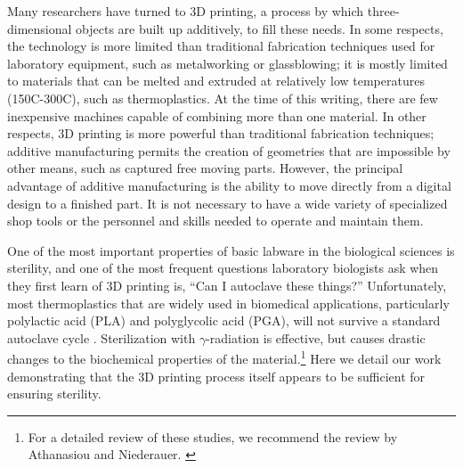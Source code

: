 \begin{refsection}
Many researchers have turned to 3D printing, a process by which three-
dimensional objects are built up additively, to fill these needs. In
some respects, the technology is more limited than traditional
fabrication techniques used for laboratory equipment, such as
metalworking or glassblowing; it is mostly limited to materials that
can be melted and extruded at relatively low temperatures (150C-300C),
such as thermoplastics.  At the time of this writing, there are few
inexpensive machines capable of combining more than one material. In
other respects, 3D printing is more powerful than traditional
fabrication techniques; additive manufacturing permits the creation of
geometries that are impossible by other means, such as captured free
moving parts. However, the principal advantage of additive
manufacturing is the ability to move directly from a digital design to
a finished part. It is not necessary to have a wide variety of
specialized shop tools or the personnel and skills needed to operate
and maintain them.

One of the most important properties of basic labware in the
biological sciences is sterility, and one of the most frequent
questions laboratory biologists ask when they first learn of 3D
printing is, ``Can I autoclave these things?'' Unfortunately, most
thermoplastics that are widely used in biomedical applications,
particularly polylactic acid (PLA) and polyglycolic acid (PGA), will
not survive a standard autoclave cycle
\cite{steam_sterilization_PLA}. Sterilization with $\gamma$-radiation
is effective, but causes drastic changes to the biochemical properties
of the material.\footnote{For a detailed review of these studies, we
  recommend the review by Athanasiou and
  Niederauer. \cite{pla_suture_review}} \cite{gama_radiation_PLA} Here
we detail our work demonstrating that the 3D printing process itself
appears to be sufficient for ensuring sterility.


\end{refsection}

